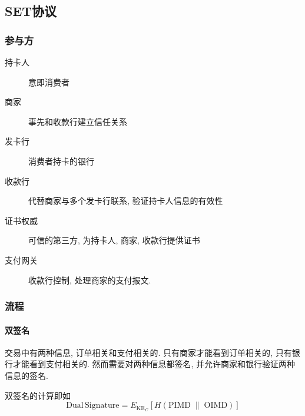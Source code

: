 \documentclass{ctexart}
\begin{document}
\subsection{SET协议}
\subsubsection{参与方}
    \begin{description}
        \item[持卡人]   意即消费者
        \item[商家]     事先和收款行建立信任关系
        \item[发卡行]   消费者持卡的银行
        \item[收款行]   代替商家与多个发卡行联系, 验证持卡人信息的有效性
        \item[证书权威] 可信的第三方, 为持卡人, 商家, 收款行提供证书
        \item[支付网关] 收款行控制, 处理商家的支付报文.
    \end{description}
\subsubsection{流程}
\paragraph{双签名} 交易中有两种信息, 订单相关和支付相关的.
    只有商家才能看到订单相关的, 只有银行才能看到支付相关的.
    然而需要对两种信息都签名, 并允许商家和银行验证两种信息的签名.\par
    双签名的计算即如\[
        \mathrm{Dual\,Signature} = E_{\mathrm{KR}_C} [H(\mathrm{PIMD} \;\|\; \mathrm{OIMD})] \]
\end{document}
